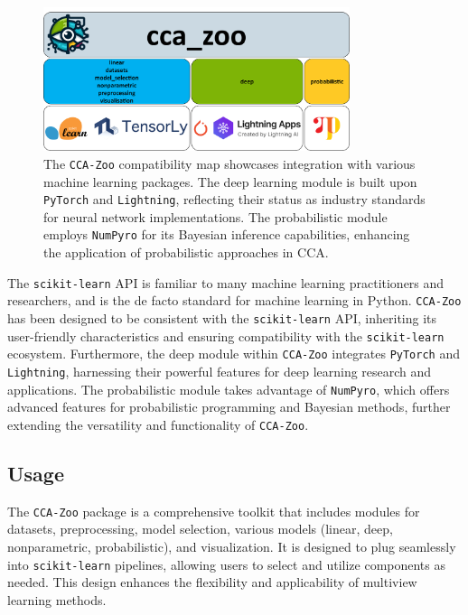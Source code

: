 \begin{figure}[ht]
    \centering
    \includegraphics[width=0.8\textwidth]{figures/CCA_Zoo_map}
    \caption[The \texttt{CCA-Zoo} compatibility map]{The \texttt{CCA-Zoo} compatibility map showcases integration with various machine learning packages. The deep learning module is built upon \texttt{PyTorch} and \texttt{Lightning}, reflecting their status as industry standards for neural network implementations. The probabilistic module employs \texttt{NumPyro} for its Bayesian inference capabilities, enhancing the application of probabilistic approaches in CCA.}
    \label{fig:cca-zoo-api}
\end{figure}

The \texttt{scikit-learn} API is familiar to many machine learning practitioners and researchers, and is the de facto standard for machine learning in Python. \texttt{CCA-Zoo} has been designed to be consistent with the \texttt{scikit-learn} API, inheriting its user-friendly characteristics and ensuring compatibility with the \texttt{scikit-learn} ecosystem. Furthermore, the deep module within \texttt{CCA-Zoo} integrates \texttt{PyTorch} and \texttt{Lightning}, harnessing their powerful features for deep learning research and applications. The probabilistic module takes advantage of \texttt{NumPyro}, which offers advanced features for probabilistic programming and Bayesian methods, further extending the versatility and functionality of \texttt{CCA-Zoo}.


\subsection{Usage}

The \texttt{CCA-Zoo} package is a comprehensive toolkit that includes modules for datasets, preprocessing, model selection, various models (linear, deep, nonparametric, probabilistic), and visualization.
It is designed to plug seamlessly into \texttt{scikit-learn} pipelines, allowing users to select and utilize components as needed.
This design enhances the flexibility and applicability of multiview learning methods.

